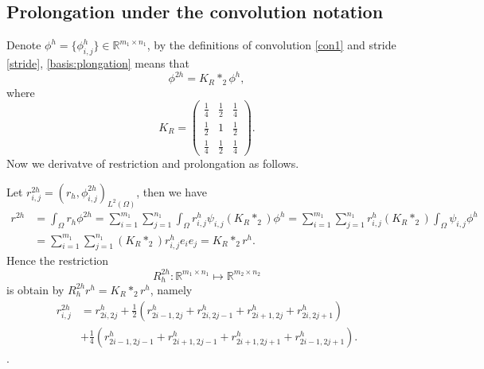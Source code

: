 \subsection{Prolongation under the convolution notation}
Denote $\phi^h=\{\phi^h_{i,j}\}\in \mathbb R^{m_1\times n_1}$, 
by the definitions of convolution \eqref{con1} and stride \eqref{stride}, \eqref{basis:plongation} means that 
$$
 \phi^{2h}=K_R\ast_2 \phi^{h},
$$
where 
\begin{equation}\label{bi-restrict}
	K_R=
	\begin{pmatrix}
	\frac{1}{4} &\frac{1}{2}&\frac{1}{4}\\
	\frac{1}{2}& 1&\frac{1}{2}\\
	\frac{1}{4}&\frac{1}{2}&  \frac{1}{4} 
	\end{pmatrix}.
	\end{equation}
Now we derivatve of restriction and prolongation as follows. 

Let $r_{i,j}^{2h}=(r_h,\phi^{2h}_{i,j})_{L^2(\Omega)}$, then we have
\begin{equation}
\begin{split}
 r^{2h}&=\int_{\Omega} r_h \phi^{2h}=\sum\limits_{i=1}^{m_1}\sum\limits_{j=1}^{n_1}\int_{\Omega}r_{i,j}^{h}\psi_{i,j}(K_R\ast_2) \phi^h
=\sum\limits_{i=1}^{m_1}\sum\limits_{j=1}^{n_1}r_{i,j}^{h}(K_R\ast_2)\int_{\Omega}\psi_{i,j} \phi^h\\
&=\sum\limits_{i=1}^{m_1}\sum\limits_{j=1}^{n_1}(K_R\ast_2)r_{i,j}^{h}e_ie_j=K_R\ast_2 r^{h}.
\end{split}
\end{equation}
Hence the restriction 
$$
R^{2h}_h: \mathbb R^{m_{1}\times n_{1}}\mapsto  \mathbb R^{m_{2}\times n_{2}} 
$$
is obtain by $R^{2h}_h  r^{h}= K_R\ast_2  r^{h}$, namely
\begin{equation}\label{restriction:freedom}
\begin{split}
r_{i,j}^{2h}&=r^{h}_{2i,2j}+\frac{1}{2}(r^{h}_{2i-1,2j}+r^{h}_{2i,2j-1}+r^{h}_{2i+1,2j}+r^{h}_{2i,2j+1})\\
&+\frac{1}{4}\left(r^{h}_{2i-1,2j-1}+r^{h}_{2i+1,2j-1}+r^{h}_{2i+1,2j+1}+r^{h}_{2i-1,2j+1}\right).
\end{split}
\end{equation}
. 

